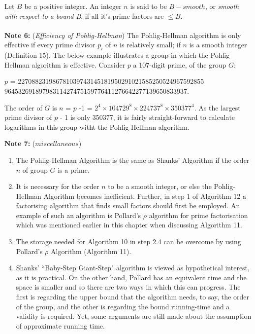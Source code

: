 \documentclass[iwp,first]{luthesis}
\begin{document}
Let $B$ be a positive integer. An integer $n$ is said to be $B-smooth$, or \textit{smooth with respect to a bound B}, if all it's prime factors are $\leq B$.
\\
\\
\textbf{Note 6:} (\textit{Efficiency of Pohlig-Hellman}) The Pohlig-Hellman algorithm is only effective if every prime divisor $p_i$ of $n$ is relatively small; if $n$ is a smooth integer (Definition 15). The below example illustrates a group in which the Pohlig-Hellman algorithm is effective. Consider $p$ a 107-digit prime, of the group $G$:

\begin{center}
$p$ = 227088231986781039743145181950291021585250524967592855
96453269189798311427475159776411276642277139650833937.
\end{center}

The order of $G$ is $n$ = $p$ -1 = $2^4 \times 104729^8 \times 224737^8 \times 350377^4$. As the largest prime divisor of $p$ - 1 is only 350377, it is fairly straight-forward to calculate logarithms in this group witht the Pohlig-Hellman algorithm.

\newpage

\textbf{Note 7:} ($miscellaneous$)

\begin{enumerate}

\item The Pohlig-Hellman Algorithm is the same as Shanks' Algorithm if the order $n$ of group $G$ is a prime.

\item It is necessary for the order $n$ to be a smooth integer, or else the Pohlig-Hellman Algorithm becomes inefficient. Further, in step 1 of Algorithm 12 a factorising algorithm that finds small factors should first be employed. An example of such an algorithm is Pollard's $\rho$ algorithm for prime factorisation which was mentioned earlier in this chapter when discussing Algorithm 11.

\item The storage needed for Algorithm 10 in step 2.4 can be overcome by using Pollard's $\rho$ Algorithm (Algorithm 11).

\item Shanks' ``Baby-Step Giant-Step" algorithm is viewed as hypothetical interest, as it is practical. On the other hand, Pollard has an equivalent time and the space is smaller and so there are two ways in which this can progress. The first is regarding the upper bound that the algorithm needs, to say, the order of the group, and the other is regarding the bound running-time and a validity is required. Yet, some arguments are still made about the assumption of approximate running time. 

\end{enumerate}
\end{document}
